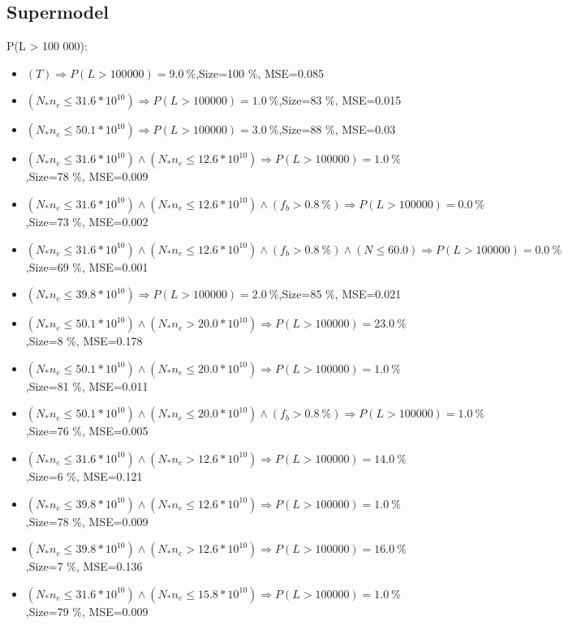 \documentclass[numbered]{CSL}
\begin{document}
\subsection{Supermodel}
P(L > 100 000):
\begin{itemize}
\item $(T) \Rightarrow P(L > 100 000) = 9.0~\%$,\hfill Size=100 \%, MSE=0.085
\item $(N_* n_e \leq 31.6 * 10^{10}) \Rightarrow P(L > 100 000) = 1.0~\%$,\hfill Size=83 \%, MSE=0.015
\item $(N_* n_e \leq 50.1 * 10^{10}) \Rightarrow P(L > 100 000) = 3.0~\%$,\hfill Size=88 \%, MSE=0.03
\item $(N_* n_e \leq 31.6 * 10^{10}) \land (N_* n_e \leq 12.6 * 10^{10}) \Rightarrow P(L > 100 000) = 1.0~\%$,\hfill Size=78 \%, MSE=0.009
\item $(N_* n_e \leq 31.6 * 10^{10}) \land (N_* n_e \leq 12.6 * 10^{10}) \land (f_b > 0.8~\%) \Rightarrow P(L > 100 000) = 0.0~\%$,\hfill Size=73 \%, MSE=0.002
\item $(N_* n_e \leq 31.6 * 10^{10}) \land (N_* n_e \leq 12.6 * 10^{10}) \land (f_b > 0.8~\%) \land (N \leq 60.0) \Rightarrow P(L > 100 000) = 0.0~\%$,\hfill Size=69 \%, MSE=0.001
\item $(N_* n_e \leq 39.8 * 10^{10}) \Rightarrow P(L > 100 000) = 2.0~\%$,\hfill Size=85 \%, MSE=0.021
\item $(N_* n_e \leq 50.1 * 10^{10}) \land (N_* n_e > 20.0 * 10^{10}) \Rightarrow P(L > 100 000) = 23.0~\%$,\hfill Size=8 \%, MSE=0.178
\item $(N_* n_e \leq 50.1 * 10^{10}) \land (N_* n_e \leq 20.0 * 10^{10}) \Rightarrow P(L > 100 000) = 1.0~\%$,\hfill Size=81 \%, MSE=0.011
\item $(N_* n_e \leq 50.1 * 10^{10}) \land (N_* n_e \leq 20.0 * 10^{10}) \land (f_b > 0.8~\%) \Rightarrow P(L > 100 000) = 1.0~\%$,\hfill Size=76 \%, MSE=0.005
\item $(N_* n_e \leq 31.6 * 10^{10}) \land (N_* n_e > 12.6 * 10^{10}) \Rightarrow P(L > 100 000) = 14.0~\%$,\hfill Size=6 \%, MSE=0.121
\item $(N_* n_e \leq 39.8 * 10^{10}) \land (N_* n_e \leq 12.6 * 10^{10}) \Rightarrow P(L > 100 000) = 1.0~\%$,\hfill Size=78 \%, MSE=0.009
\item $(N_* n_e \leq 39.8 * 10^{10}) \land (N_* n_e > 12.6 * 10^{10}) \Rightarrow P(L > 100 000) = 16.0~\%$,\hfill Size=7 \%, MSE=0.136
\item $(N_* n_e \leq 31.6 * 10^{10}) \land (N_* n_e \leq 15.8 * 10^{10}) \Rightarrow P(L > 100 000) = 1.0~\%$,\hfill Size=79 \%, MSE=0.009

\end{itemize}
\end{document}
